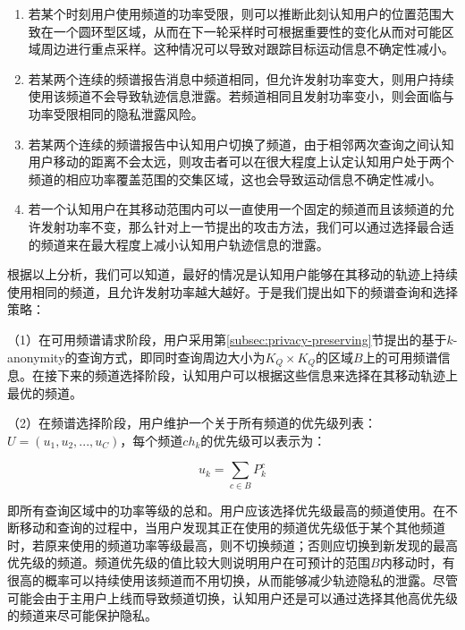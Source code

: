 \begin{enumerate}

\item 若某个时刻用户使用频道的功率受限，则可以推断此刻认知用户的位置范围大致在一个圆环型区域，从而在下一轮采样时可根据重要性的变化从而对可能区域周边进行重点采样。这种情况可以导致对跟踪目标运动信息不确定性减小。

\item 若某两个连续的频谱报告消息中频道相同，但允许发射功率变大，则用户持续使用该频道不会导致轨迹信息泄露。若频道相同且发射功率变小，则会面临与功率受限相同的隐私泄露风险。

\item 若某两个连续的频谱报告中认知用户切换了频道，由于相邻两次查询之间认知用户移动的距离不会太远，则攻击者可以在很大程度上认定认知用户处于两个频道的相应功率覆盖范围的交集区域，这也会导致运动信息不确定性减小。

\item 若一个认知用户在其移动范围内可以一直使用一个固定的频道而且该频道的允许发射功率不变，那么针对上一节提出的攻击方法，我们可以通过选择最合适的频道来在最大程度上减小认知用户轨迹信息的泄露。

\end{enumerate}

根据以上分析，我们可以知道，最好的情况是认知用户能够在其移动的轨迹上持续使用相同的频道，且允许发射功率越大越好。于是我们提出如下的频谱查询和选择策略：

（1）在可用频谱请求阶段，用户采用第\ref{subsec:privacy-preserving}节提出的基于$k$-anonymity的查询方式，即同时查询周边大小为$K_{Q} \times K_{Q}$的区域$B$上的可用频谱信息。在接下来的频道选择阶段，认知用户可以根据这些信息来选择在其移动轨迹上最优的频道。

（2）在频谱选择阶段，用户维护一个关于所有频道的优先级列表：$U=(u_{1},u_{2},...,u_{C})$，每个频道$ch_{k}$的优先级可以表示为：

\begin{equation}
u_{k} = \sum_{c \in B} P_{k}^{c}
\end{equation}

即所有查询区域中的功率等级的总和。用户应该选择优先级最高的频道使用。在不断移动和查询的过程中，当用户发现其正在使用的频道优先级低于某个其他频道时，若原来使用的频道功率等级最高，则不切换频道；否则应切换到新发现的最高优先级的频道。频道优先级的值比较大则说明用户在可预计的范围$B$内移动时，有很高的概率可以持续使用该频道而不用切换，从而能够减少轨迹隐私的泄露。尽管可能会由于主用户上线而导致频道切换，认知用户还是可以通过选择其他高优先级的频道来尽可能保护隐私。


